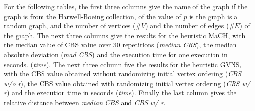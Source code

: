 \documentclass{scrartcl}
\theoremstyle{plain}
\newcommand{\algo}{MaCH}
\newcommand{\gvns}{GVNS}
\newcommand{\cbs}{CBS}
\begin{document}
For the following tables, the first three columns give the name of the 
graph if the graph is from the Harwell-Boeing collection, of the value of 
$p$ is the graph is a random graph, and the number of vertices 
(\emph{$\#V$}) and the number of edges (\emph{$\#E$}) of the graph. The next 
three columns give the results for the heuristic \algo{}, with the median value 
of \cbs{} value over 30 repetitions (\emph{median \cbs{}}), the median absolute 
deviation (\emph{mad \cbs{}}) and the execution time for one execution in 
seconds. (\emph{time}). The next three column five the results for the heuristic 
\gvns{}, with the \cbs{} value obtained without randomizing initial vertex 
ordering (\emph{\cbs{} w/o r}), the \cbs{} value obtained with randomizing 
initial vertex ordering (\emph{\cbs{} w/ r}) and the execution time in seconds 
(\emph{time}). Finally the last column gives the relative distance between 
\emph{median \cbs{}} and \emph{\cbs{} 
w/ r}.
\end{document}
